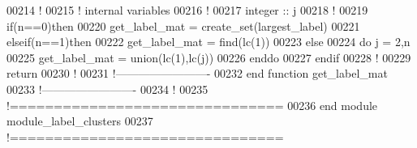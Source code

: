 \begin{DoxyCode}
00214     \textcolor{comment}{!}
00215     \textcolor{comment}{! internal variables}
00216     \textcolor{comment}{!}
00217     \textcolor{keywordtype}{integer} :: j
00218     \textcolor{comment}{!}
00219     \textcolor{keyword}{if}(n==0)\textcolor{keyword}{then}
00220        get\_label\_mat = create\_set(largest\_label)
00221     elseif(n==1)\textcolor{keyword}{then}
00222        get\_label\_mat = find(lc(1))
00223     \textcolor{keyword}{else}
00224        \textcolor{keyword}{do} j = 2,n
00225           get\_label\_mat = union(lc(1),lc(j))
00226        \textcolor{keyword}{enddo}
00227     \textcolor{keyword}{endif}
00228     \textcolor{comment}{!}
00229     return
00230     \textcolor{comment}{!}
00231   \textcolor{comment}{!-------------------------}
00232 \textcolor{keyword}{  end function get\_label\_mat}
00233   \textcolor{comment}{!-------------------------}
00234   \textcolor{comment}{!}
00235 \textcolor{comment}{!===============================}
00236 \textcolor{keyword}{end module module\_label\_clusters}
00237 \textcolor{comment}{!===============================}
\end{DoxyCode}
